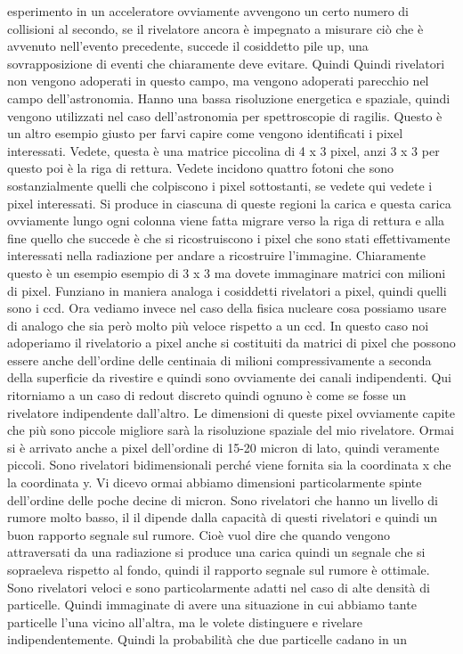 esperimento in un acceleratore ovviamente avvengono un certo numero di collisioni al secondo, se il rivelatore ancora è impegnato a misurare ciò che è avvenuto nell'evento precedente, succede il cosiddetto pile up, una sovrapposizione di eventi che chiaramente deve evitare. Quindi Quindi rivelatori non vengono adoperati in questo campo, ma vengono adoperati parecchio nel campo dell'astronomia. Hanno una bassa risoluzione energetica e spaziale, quindi vengono utilizzati nel caso dell'astronomia per spettroscopie di ragilis. Questo è un altro esempio giusto per farvi capire come vengono identificati i pixel interessati. Vedete, questa è una matrice piccolina di 4 x 3 pixel, anzi 3 x 3 per questo poi è la riga di rettura. Vedete incidono quattro fotoni che sono sostanzialmente quelli che colpiscono i pixel sottostanti, se vedete qui vedete i pixel interessati. Si produce in ciascuna di queste regioni la carica e questa carica ovviamente lungo ogni colonna viene fatta migrare verso la riga di rettura e alla fine quello che succede è che si ricostruiscono i pixel che sono stati effettivamente interessati nella radiazione per andare a ricostruire l'immagine. Chiaramente questo è un esempio esempio di 3 x 3 ma dovete immaginare matrici con milioni di pixel. Funziano in maniera analoga i cosiddetti rivelatori a pixel, quindi quelli sono i ccd. Ora vediamo invece nel caso della fisica nucleare cosa possiamo usare di analogo che sia però molto più veloce rispetto a un ccd. In questo caso noi adoperiamo il rivelatorio a pixel anche si costituiti da matrici di pixel che possono essere anche dell'ordine delle centinaia di milioni compressivamente a seconda della superficie da rivestire e quindi sono ovviamente dei canali indipendenti. Qui ritorniamo a un caso di redout discreto quindi ognuno è come se fosse un rivelatore indipendente dall'altro. Le dimensioni di queste pixel ovviamente capite che più sono piccole migliore sarà la risoluzione spaziale del mio rivelatore. Ormai si è arrivato anche a pixel dell'ordine di 15-20 micron di lato, quindi veramente piccoli. Sono rivelatori bidimensionali perché viene fornita sia la coordinata x che la coordinata y. Vi dicevo ormai abbiamo dimensioni particolarmente spinte dell'ordine delle poche decine di micron. Sono rivelatori che hanno un livello di rumore molto basso, il il dipende dalla capacità di questi rivelatori e quindi un buon rapporto segnale sul rumore. Cioè vuol dire che quando vengono attraversati da una radiazione si produce una carica quindi un segnale che si sopraeleva rispetto al fondo, quindi il rapporto segnale sul rumore è ottimale. Sono rivelatori veloci e sono particolarmente adatti nel caso di alte densità di particelle. Quindi immaginate di avere una situazione in cui abbiamo tante particelle l'una vicino all'altra, ma le volete distinguere e rivelare indipendentemente. Quindi la probabilità che due particelle cadano in un 

